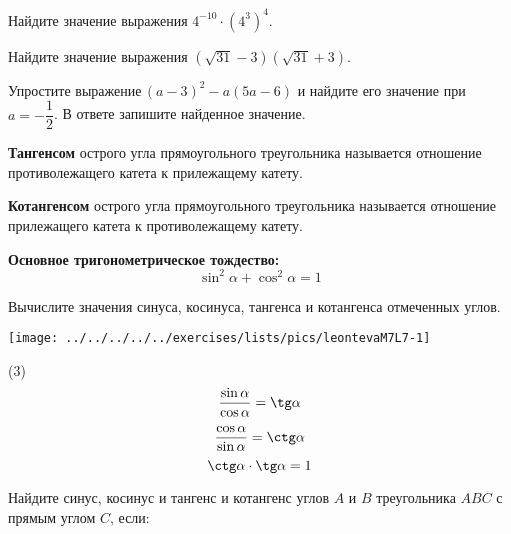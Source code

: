 \begin{class}[number=7]
	\begin{listofex}
		\item Найдите значение выражения \( 4^{-10}\cdot(4^{3})^{4} \).
		\item Найдите значение выражения \( (\sqrt{31 }-3)(\sqrt{31}+3) \).
		\item Упростите выражение \( (a-3)^{2}-a(5a-6) \) и найдите его значение при \( a=-\dfrac{1}{2} \).  В ответе запишите найденное значение.
	\end{listofex}
	\begin{definit}
		\textbf{Тангенсом} острого угла прямоугольного треугольника называется отношение противолежащего катета к прилежащему катету.
	\end{definit}
	\begin{definit}
		\textbf{Котангенсом} острого угла прямоугольного треугольника называется отношение прилежащего катета к противолежащему катету.
	\end{definit}
	\begin{definit}
		\textbf{Основное тригонометрическое тождество:} \[\sin^2\alpha+\cos^2\alpha=1\]
	\end{definit}
	\begin{listofex}[resume]
		\item
		\begin{minipage}[t]{\bodywidth}
			Вычислите значения синуса, косинуса, тангенса и котангенса отмеченных углов.
		\end{minipage}
		\hspace{0.02\linewidth}
		\begin{minipage}[t]{\picwidth}
			\texttt{[image: ../../../../../exercises/lists/pics/leontevaM7L7-1]}
		\end{minipage}
	\end{listofex}
		\begin{definit}
			\begin{tasks}(3)
				\task[] \[\dfrac{\sin\alpha}{\cos \alpha}=\tg \alpha\] 
				\task[] \[\dfrac{\cos\alpha}{\sin \alpha}=\ctg \alpha\] 
				\task[] \[\ctg\alpha\cdot\tg \alpha = 1\]
			\end{tasks}
		\end{definit}
	\begin{listofex}[resume]
		\item Найдите синус, косинус и тангенс и котангенс углов \( A \) и \( B \) треугольника \( ABC \) с прямым углом \( C \), если:

\end{listofex}
\end{class}

